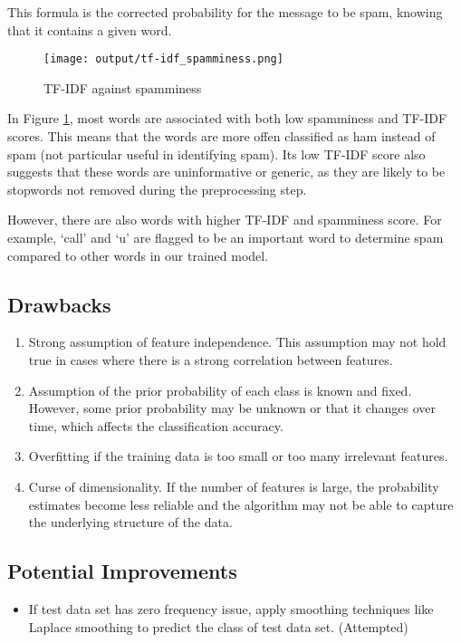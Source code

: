 This formula is the corrected probability for the message to be spam, knowing that it contains a given word.

\begin{figure}[h]
    \centering
    \texttt{[image: output/tf-idf\_spamminess.png]}
    \caption{TF-IDF against spamminess}
    \label{fig:tfidf-spamminess}
\end{figure}

In Figure \ref{fig:tfidf-spamminess}, most words are associated with both low spamminess and TF-IDF scores. 
This means that the words are more offen classified as ham instead of spam (not particular useful in identifying spam).
Its low TF-IDF score also suggests that these words are uninformative or generic, as they are likely to be stopwords not removed during the preprocessing step.

However, there are also words with higher TF-IDF and spamminess score. 
For example, `call' and `u' are flagged to be an important word to determine spam compared to other words in our trained model.


\subsection{Drawbacks \cite{bathula2023limitations}}

\begin{enumerate}
    \item Strong assumption of feature independence. This assumption may not hold true in cases where there is a strong correlation between features.
    \item Assumption of the prior probability of each class is known and fixed. However, some prior probability may be unknown or that it changes over time, which affects the classification accuracy.
    \item Overfitting if the training data is too small or too many irrelevant features.
    \item Curse of dimensionality. If the number of features is large, the probability estimates become less reliable and the algorithm may not be able to capture the underlying structure of the data.
\end{enumerate}


\subsection{Potential Improvements}

\begin{itemize}
    \item If test data set has zero frequency issue, apply smoothing techniques like Laplace smoothing to predict the class of test data set. (Attempted)
\end{itemize}
